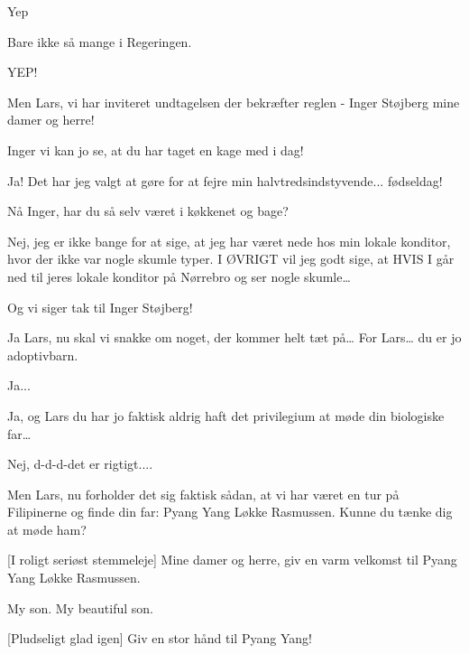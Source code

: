 \documentclass[a4paper,11pt]{article}
\begin{document}
\begin{sketch}
 Yep

 Bare ikke så mange i Regeringen. 

 YEP!

 Men Lars, vi har inviteret undtagelsen der bekræfter reglen - Inger Støjberg mine damer og herre! 


 Inger vi kan jo se, at du har taget en kage med i dag!

 Ja! Det har jeg valgt at gøre for at fejre min halvtredsindstyvende... fødseldag!

 Nå Inger, har du så selv været i køkkenet og bage?

 Nej, jeg er ikke bange for at sige, at jeg har været nede hos min lokale konditor, hvor der ikke var nogle skumle typer. I ØVRIGT vil jeg godt sige, at HVIS I går ned til jeres lokale konditor på Nørrebro og ser nogle skumle…

 Og vi siger tak til Inger Støjberg! 

 Ja Lars, nu skal vi snakke om noget, der kommer helt tæt på… For Lars… du er jo adoptivbarn.

  Ja...

 Ja, og Lars du har jo faktisk aldrig haft det privilegium at møde din biologiske far…


  Nej, d-d-d-det er rigtigt....

 Men Lars, nu forholder det sig faktisk sådan, at vi har været en tur på Filipinerne og finde din far: Pyang Yang Løkke Rasmussen. Kunne du tænke dig at møde ham?

[I roligt seriøst stemmeleje] Mine damer og herre, giv en varm velkomst til Pyang Yang Løkke Rasmussen.


 My son. My beautiful son.

[Pludseligt glad igen] Giv en stor hånd til Pyang Yang! 


\end{sketch}
\end{document}
